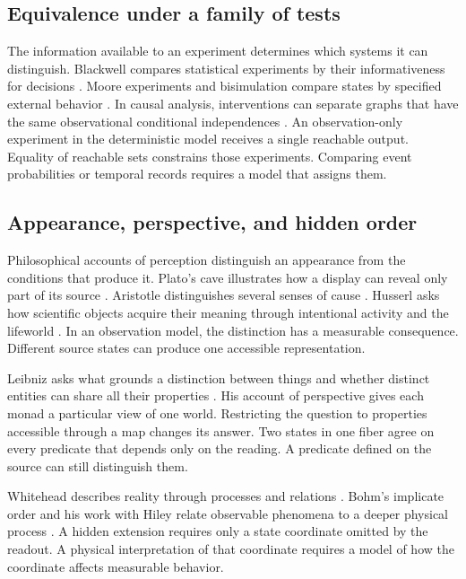 \subsection{Equivalence under a family of tests}

The information available to an experiment determines which systems it can distinguish. Blackwell compares statistical experiments by their informativeness for decisions \parencite{Blackwell1951,Blackwell1953,Torgersen1991}. Moore experiments and bisimulation compare states by specified external behavior \parencite{Moore1956,Park1981,Milner1989,LarsenSkou1991,Rutten2000}. In causal analysis, interventions can separate graphs that have the same observational conditional independences \parencite{VermaPearl1990,Chickering1995,Andersson1997,Pearl2009,HauserBuhlmann2012}. An observation-only experiment in the deterministic model receives a single reachable output. Equality of reachable sets constrains those experiments. Comparing event probabilities or temporal records requires a model that assigns them.

\subsection{Appearance, perspective, and hidden order}

Philosophical accounts of perception distinguish an appearance from the conditions that produce it. Plato's cave illustrates how a display can reveal only part of its source \parencite{Plato1992}. Aristotle distinguishes several senses of cause \parencite{Aristotle1984}. Husserl asks how scientific objects acquire their meaning through intentional activity and the lifeworld \parencite{Husserl1970}. In an observation model, the distinction has a measurable consequence. Different source states can produce one accessible representation.

Leibniz asks what grounds a distinction between things and whether distinct entities can share all their properties \parencite{Leibniz1989,LeibnizClarke2000}. His account of perspective gives each monad a particular view of one world. Restricting the question to properties accessible through a map changes its answer. Two states in one fiber agree on every predicate that depends only on the reading. A predicate defined on the source can still distinguish them.

Whitehead describes reality through processes and relations \parencite{Whitehead1978}. Bohm's implicate order and his work with Hiley relate observable phenomena to a deeper physical process \parencite{Bohm1980,BohmHiley1993}. A hidden extension requires only a state coordinate omitted by the readout. A physical interpretation of that coordinate requires a model of how the coordinate affects measurable behavior.


